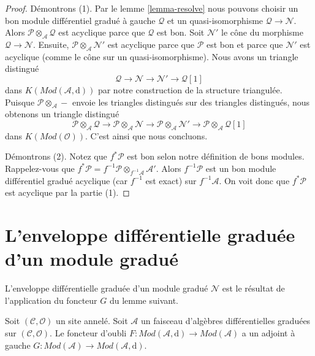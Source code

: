 \begin{proof}
Démontrons (1).
Par le lemme \ref{lemma-resolve}  nous pouvons choisir un bon module différentiel gradué à gauche $\mathcal{Q}$ et un quasi-isomorphisme $\mathcal{Q} \to \mathcal{N}$.
Alors $\mathcal{P} \otimes_\mathcal{A} \mathcal{Q}$ est acyclique parce que $\mathcal{Q}$ est bon.
Soit $\mathcal{N}'$ le cône du morphisme $\mathcal{Q} \to \mathcal{N}$.
Ensuite, $\mathcal{P} \otimes_\mathcal{A} \mathcal{N}'$ est acyclique parce que $\mathcal{P}$ est bon et parce que $\mathcal{N}'$ est acyclique (comme le cône sur un quasi-isomorphisme).
Nous avons un triangle distingué
$$
\mathcal{Q} \to \mathcal{N} \to \mathcal{N}' \to \mathcal{Q}[1]
$$
dans $K(\textit{Mod}(\mathcal{A}, \text{d}))$ par notre construction de la structure triangulée.
Puisque $\mathcal{P} \otimes_\mathcal{A} -$ envoie les triangles distingués sur des triangles distingués, nous obtenons un triangle distingué
$$
\mathcal{P} \otimes_\mathcal{A} \mathcal{Q} \to
\mathcal{P} \otimes_\mathcal{A} \mathcal{N} \to
\mathcal{P} \otimes_\mathcal{A} \mathcal{N}' \to
\mathcal{P} \otimes_\mathcal{A} \mathcal{Q}[1]
$$
dans $K(\textit{Mod}(\mathcal{O}))$.
C'est ainsi que nous concluons.

\medskip\noindent
Démontrons (2).
Notez que $f^*\mathcal{P}$ est bon selon notre définition de bons modules.
Rappelez-vous que $f^*\mathcal{P} = f^{-1}\mathcal{P} \otimes_{f^{-1}\mathcal{A}} \mathcal{A}'$.
Alors $f^{-1}\mathcal{P}$ est un bon module différentiel gradué acyclique (car $f^{-1}$ est exact) sur $f^{-1}\mathcal{A}$.
On voit donc que $f^*\mathcal{P}$ est acyclique par la partie (1).
\end{proof}






\section{L'enveloppe différentielle graduée d'un module gradué}
\label{section-dg-hull}

\noindent
L'enveloppe différentielle graduée d'un module gradué $\mathcal{N}$ est le résultat de l'application du foncteur $G$ du lemme suivant.

\begin{lemma}
\label{lemma-dg-hull}
Soit $(\mathcal{C}, \mathcal{O})$ un site annelé.
Soit $\mathcal{A}$ un faisceau d'algèbres différentielles graduées sur $(\mathcal{C}, \mathcal{O})$.
Le foncteur d'oubli $F : \textit{Mod}(\mathcal{A}, \text{d}) \to \textit{Mod}(\mathcal{A})$ a un adjoint à gauche $G : \textit{Mod}(\mathcal{A}) \to \textit{Mod}(\mathcal{A}, \text{d})$.
\end{lemma}

